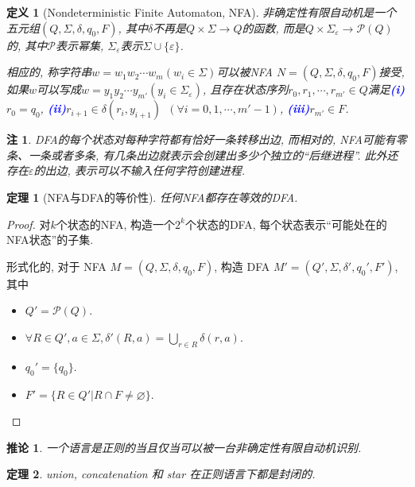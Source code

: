 \documentclass[8pt]{article}
\theoremstyle{compact}
\newtheorem{theorem}{定理}
\newtheorem{definition}{定义}
\newtheorem{corollary}{推论}
\newtheorem{remark}{注}
\def\num#1{\textnormal{\textbf{\mbox{\textcolor{blue}{(#1)}}}}}
\begin{document}
\begin{definition}[Nondeterministic Finite Automaton, NFA]
	非确定性有限自动机是一个五元组$(Q, \Sigma, \delta, q_0, F)$, 其中$\delta$不再是$Q \times \Sigma \to Q$的函数, 而是$Q \times \Sigma_{\varepsilon} \to \mathcal P(Q)$的, 其中$\mathcal P$表示幂集, $\Sigma_{\varepsilon}$表示$\Sigma \cup \{\varepsilon\}$. 

	相应的, 称字符串$w = w_1w_2\cdots w_m(w_i \in \Sigma)$可以被NFA $N = (Q, \Sigma, \delta, q_0, F)$接受, 如果$w$可以写成$w = y_1y_2\cdots y_{m'}(y_i \in \Sigma_{\varepsilon})$, 且存在状态序列$r_0, r_1, \cdots, r_{m'} \in Q$满足\num{i}$r_0 = q_0$, \num{ii}$r_{i+1} \in \delta(r_i, y_{i+1})$\ $(\forall i = 0, 1, \cdots, {m'}-1)$, \num{iii}$r_{m'} \in F$. 
\end{definition}
\begin{remark}
	DFA的每个状态对每种字符都有恰好一条转移出边, 而相对的, NFA可能有零条、一条或者多条, 有几条出边就表示会创建出多少个独立的“后继进程”. 此外还存在$\varepsilon$的出边, 表示可以不输入任何字符创建进程. 
\end{remark}
\begin{theorem}[NFA与DFA的等价性]
	任何NFA都存在等效的DFA. 
\end{theorem}
\begin{proof}
	对$k$个状态的NFA, 构造一个$2^k$个状态的DFA, 每个状态表示“可能处在的NFA状态”的子集. 

	形式化的, 对于 NFA $M = (Q, \Sigma, \delta, q_0, F)$, 构造 DFA $M' = (Q', \Sigma, \delta', q_0', F')$, 其中
	\begin{itemize}
		\item $Q' = \mathcal P(Q)$.
		\item $\forall R \in Q', a \in \Sigma, \delta'(R, a) = \bigcup_{r \in R}\delta(r, a)$.
		\item $q_0' = \{q_0\}$.
		\item $F' = \{R \in Q' | R \cap F \neq \varnothing\}$.
	\end{itemize}
\end{proof}
\begin{corollary}
	一个语言是正则的当且仅当可以被一台非确定性有限自动机识别. 
\end{corollary}
\begin{theorem}
	union, concatenation 和 star 在正则语言下都是封闭的. 
\end{theorem}
\end{document}
